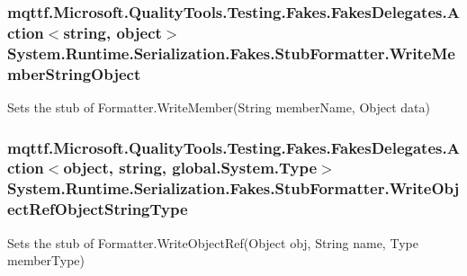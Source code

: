 \hypertarget{class_system_1_1_runtime_1_1_serialization_1_1_fakes_1_1_stub_formatter_ac5920158ec990d7e3467f18fb40122db}{
\subsubsection[{Write\-Member\-String\-Object}]{\setlength{\rightskip}{0pt plus 5cm}mqttf.\-Microsoft.\-Quality\-Tools.\-Testing.\-Fakes.\-Fakes\-Delegates.\-Action$<$string, object$>$ System.\-Runtime.\-Serialization.\-Fakes.\-Stub\-Formatter.\-Write\-Member\-String\-Object}}\label{class_system_1_1_runtime_1_1_serialization_1_1_fakes_1_1_stub_formatter_ac5920158ec990d7e3467f18fb40122db}


Sets the stub of Formatter.\-Write\-Member(\-String member\-Name, Object data)

\hypertarget{class_system_1_1_runtime_1_1_serialization_1_1_fakes_1_1_stub_formatter_a1410892720327222b94287cd7cf993f5}{
\subsubsection[{Write\-Object\-Ref\-Object\-String\-Type}]{\setlength{\rightskip}{0pt plus 5cm}mqttf.\-Microsoft.\-Quality\-Tools.\-Testing.\-Fakes.\-Fakes\-Delegates.\-Action$<$object, string, global.\-System.\-Type$>$ System.\-Runtime.\-Serialization.\-Fakes.\-Stub\-Formatter.\-Write\-Object\-Ref\-Object\-String\-Type}}\label{class_system_1_1_runtime_1_1_serialization_1_1_fakes_1_1_stub_formatter_a1410892720327222b94287cd7cf993f5}


Sets the stub of Formatter.\-Write\-Object\-Ref(\-Object obj, String name, Type member\-Type)


